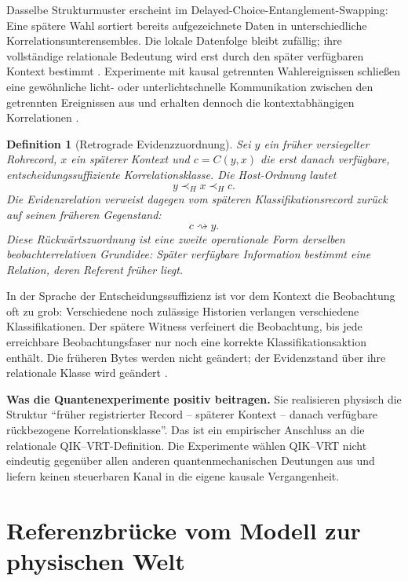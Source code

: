 \documentclass[11pt,a4paper]{article}
\newtheorem{definition}{Definition}[section]
\theoremstyle{remark}
\newcommand{\host}{\prec_{\!H}}
\newcommand{\statusbox}[2]{%
  \par\medskip\noindent
  \colorbox{#1}{\parbox{\dimexpr\linewidth-2\fboxsep\relax}{#2}}%
  \par\medskip
}
\begin{document}
Dasselbe Strukturmuster erscheint im Delayed-Choice-Entanglement-Swapping:
Eine spätere Wahl sortiert bereits aufgezeichnete Daten in unterschiedliche
Korrelationsunterensembles. Die lokale Datenfolge bleibt zufällig; ihre
vollständige relationale Bedeutung wird erst durch den später verfügbaren
Kontext bestimmt \cite{Ma2012}. Experimente mit kausal getrennten
Wahlereignissen schließen eine gewöhnliche licht- oder unterlichtschnelle
Kommunikation zwischen den getrennten Ereignissen aus und erhalten dennoch
die kontextabhängigen Korrelationen \cite{Jacques2007,Ma2013}.

\begin{definition}[Retrograde Evidenzzuordnung]
Sei \(y\) ein früher versiegelter Rohrecord, \(x\) ein späterer Kontext und
\(c=C(y,x)\) die erst danach verfügbare, entscheidungssuffiziente
Korrelationsklasse. Die Host-Ordnung lautet
\[
  y\host x\host c.
\]
Die Evidenzrelation verweist dagegen vom späteren Klassifikationsrecord
zurück auf seinen früheren Gegenstand:
\[
  c\rightsquigarrow y.
\]
Diese Rückwärtszuordnung ist eine zweite operationale Form derselben
beobachterrelativen Grundidee: Später verfügbare Information bestimmt eine
Relation, deren Referent früher liegt.
\end{definition}

In der Sprache der Entscheidungssuffizienz ist vor dem Kontext die
Beobachtung oft zu grob: Verschiedene noch zulässige Historien verlangen
verschiedene Klassifikationen. Der spätere Witness verfeinert die Beobachtung,
bis jede erreichbare Beobachtungsfaser nur noch eine korrekte
Klassifikationsaktion enthält. Die früheren Bytes werden nicht geändert; der
Evidenzstand über ihre relationale Klasse wird geändert
\cite{LohmannDecisionSufficiency2026}.

\statusbox{QAmber}{
  \textbf{Was die Quantenexperimente positiv beitragen.}
  Sie realisieren physisch die Struktur ``früher registrierter Record --
  späterer Kontext -- danach verfügbare rückbezogene Korrelationsklasse''.
  Das ist ein empirischer Anschluss an die relationale QIK--VRT-Definition.
  Die Experimente wählen QIK--VRT nicht eindeutig gegenüber allen anderen
  quantenmechanischen Deutungen aus und liefern keinen steuerbaren Kanal in
  die eigene kausale Vergangenheit.
}

\section{Referenzbrücke vom Modell zur physischen Welt}
\end{document}
